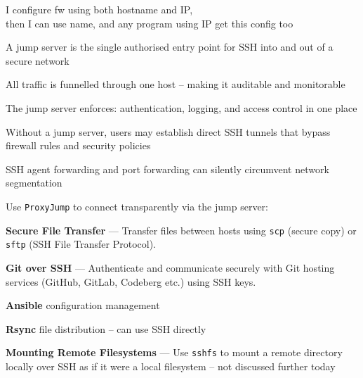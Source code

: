 \documentclass[Screen16to9,17pt]{foils}
\begin{document}
I configure fw using both hostname and IP,\\
then I can use name, and any program using IP get this config too



\begin{list2}
\item A jump server is the single authorised entry point for SSH into and out of a secure network
\item All traffic is funnelled through one host -- making it auditable and monitorable
\item The jump server enforces: authentication, logging, and access control in one place
\item Without a jump server, users may establish direct SSH tunnels that bypass firewall rules and security policies
\item SSH agent forwarding and port forwarding can silently circumvent network segmentation
\item Use \verb+ProxyJump+ to connect transparently via the jump server:
\end{list2}







\begin{list2}
\item {\bf Secure File Transfer} --- Transfer files between hosts using \verb+scp+ (secure copy) or \verb+sftp+ (SSH File Transfer Protocol).
\item {\bf Git over SSH} --- Authenticate and communicate securely with Git hosting services (GitHub, GitLab, Codeberg etc.) using SSH keys.
\item {\bf Ansible} configuration management
\item {\bf Rsync} file distribution -- can use SSH directly
\item {\bf Mounting Remote Filesystems} --- Use \verb+sshfs+ to mount a remote directory locally over SSH as if it were a local filesystem -- not discussed further today
\end{list2}

\end{document}
